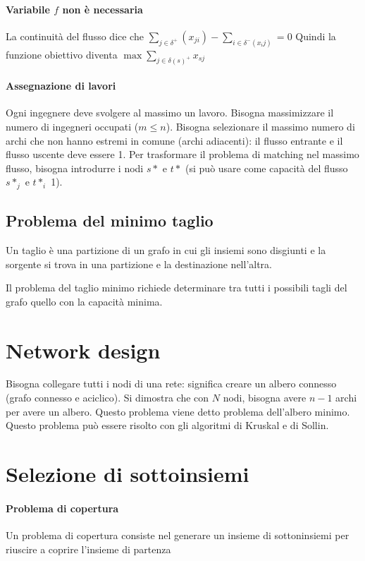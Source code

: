 \documentclass{article}
\begin{document}
\paragraph{Variabile $f$ non è necessaria}
La continuità del flusso dice che $\sum_{j\in \delta^+} (x_{ji}) - 
\sum_{i\in \delta^-(x_ij)} = 0$
Quindi la funzione obiettivo diventa $\max \sum_{j\in\delta(s)^+} x_{sj}$

\paragraph{Assegnazione di lavori}
Ogni ingegnere deve svolgere al massimo un lavoro. Bisogna massimizzare il 
numero di ingegneri occupati ($m \leq n$). Bisogna selezionare il massimo numero 
di archi che non hanno estremi in comune (archi adiacenti): il flusso entrante 
e il flusso uscente deve essere 1. Per trasformare il problema di matching 
nel massimo flusso, bisogna introdurre i nodi $s*$ e $t*$ (si può usare come 
capacità del flusso $s*_{j}$ e $t*_{i}$ 1).

\subsection{Problema del minimo taglio}
Un taglio è una partizione di un grafo in cui gli insiemi sono disgiunti e 
la sorgente si trova in una partizione e la destinazione nell'altra.

Il problema del taglio minimo richiede determinare tra tutti i possibili tagli 
del grafo quello con la capacità minima.

\section{Network design}
Bisogna collegare tutti i nodi di una rete: significa creare un albero connesso
(grafo connesso e aciclico). Si dimostra che con $N$ nodi, bisogna avere $n-1$ 
archi per avere un albero. 
Questo problema viene detto problema dell'albero minimo. Questo problema 
può essere risolto con gli algoritmi di Kruskal e di Sollin.

\section {Selezione di sottoinsiemi}
\paragraph{Problema di copertura}
Un problema di copertura consiste nel generare un insieme di sottoninsiemi per
riuscire a coprire l'insieme di partenza
\end{document}
